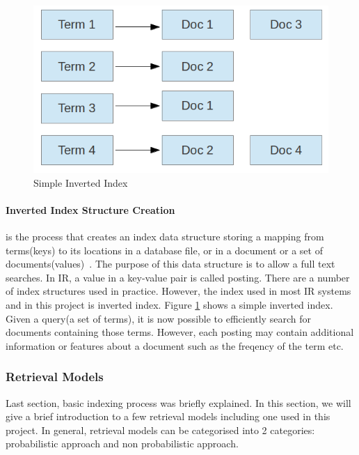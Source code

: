 \begin{figure}
\centering
\includegraphics[scale=0.5]{./figures/invertedIndex.png}
\caption{Simple Inverted Index} \label{fig:invertedIndex} 
\end{figure}

\paragraph{Inverted Index Structure Creation} is the process that creates an index data structure storing a mapping from terms(keys) to its 
locations in a database file, or in a document or a set of documents(values)~\cite{invertedindex}. 
The purpose of this data structure is to allow a full text searches. In IR, a value in a key-value pair is called posting. There are a number of index
structures used in practice. However, the index used in most IR systems and in this project is inverted index.
Figure \ref{fig:invertedIndex} shows a simple inverted index. Given a query(a set of terms), it is now possible to efficiently search for
documents containing those terms. However, each posting may contain additional information or features
about a document such as the freqency of the term etc.

\subsubsection{Retrieval Models}\label{section:retrievalmodel}
Last section, basic indexing process was briefly explained. In this section, we will give a brief introduction to a few retrieval models including one
used in this project. In general, retrieval models can be categorised into 2 categories: probabilistic approach and non probabilistic approach.

